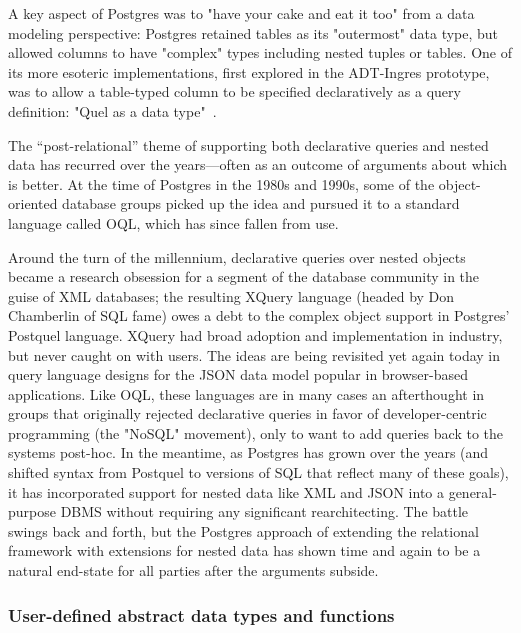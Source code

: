 \documentclass[sigconf,natbib=false]{acmart}
\begin{document}
A key aspect of Postgres was to "have your cake and eat it too" from a data modeling perspective: Postgres retained tables as its "outermost" data type, but allowed columns to have "complex" types including nested tuples or tables. One of its more esoteric implementations, first explored in the ADT-Ingres prototype, was to allow a table-typed column to be specified declaratively as a query definition: "Quel as a data type"~\cite{Stonebraker:1984:QDT:602259.602287}.



The ``post-relational'' theme of supporting both declarative queries and nested data has recurred over the years---often as an outcome of arguments about which is better. At the time of Postgres in the 1980s and 1990s, some of the object-oriented database groups picked up the idea and pursued it to a standard language called OQL, which has since fallen from use. 

Around the turn of the millennium, declarative queries over nested objects became a research obsession for a segment of the database community in the guise of XML databases; the resulting XQuery language (headed by Don Chamberlin of SQL fame) owes a debt to the complex object support in Postgres' Postquel language. XQuery had broad adoption and implementation in industry, but never caught on with users. The ideas are being revisited yet again today in query language designs for the JSON data model popular in browser-based applications. Like OQL, these languages are in many cases an afterthought in groups that originally rejected declarative queries in favor of developer-centric programming (the "NoSQL" movement), only to want to add queries back to the systems post-hoc. In the meantime, as Postgres has grown over the years (and shifted syntax from Postquel to versions of SQL that reflect many of these goals), it has incorporated support for nested data like XML and JSON into a general-purpose DBMS without requiring any significant rearchitecting. The battle swings back and forth, but the Postgres approach of extending the relational framework with extensions for nested data has shown time and again to be a natural end-state for all parties after the arguments subside.

\subsubsection{User-defined abstract data types and functions}
\end{document}
